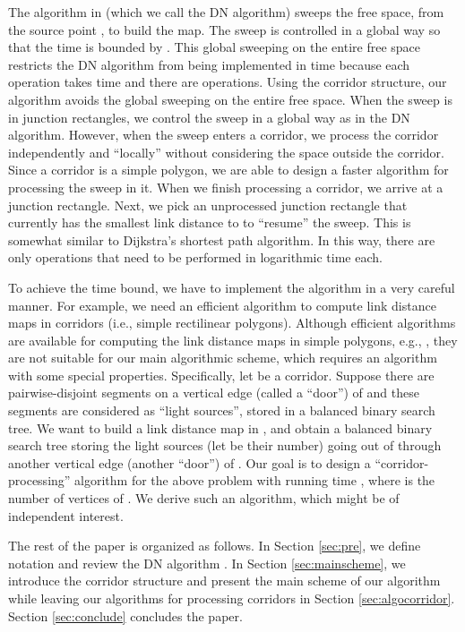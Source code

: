 \documentclass[english,runningheads,11pt]{llncs-revised}
\begin{document}
The algorithm in \cite{ref:DasGe91} (which we call the DN algorithm) sweeps the free space, from the source point , to build the map.
The sweep is controlled in a global way so that the time is bounded by
. This global sweeping on the entire free space restricts the DN algorithm from being implemented in  time because each operation takes  time and there are  operations. Using the corridor structure, our algorithm avoids the global sweeping on the entire free space.
When the sweep is in junction rectangles, we control the sweep in a global way as
in the DN algorithm. However, when the sweep enters a corridor,
we process the corridor independently and ``locally'' without considering the
space outside the corridor. Since a
corridor is a simple polygon, we are able to design a
faster algorithm for processing the sweep in it.
When we finish processing a corridor, we arrive at a junction rectangle.
Next, we pick an unprocessed junction
rectangle that currently has the smallest link distance to  to
``resume'' the sweep. This is somewhat similar to Dijkstra's shortest path algorithm.
In this way, there are only  operations that need to be performed in logarithmic time each.


To achieve the  time bound, we have to implement the algorithm in a very careful manner. For example, we need an efficient
algorithm to compute link distance maps in corridors (i.e.,
simple rectilinear polygons).
Although efficient algorithms are available for computing the link
distance maps in simple polygons, e.g.,
\cite{ref:deBergOn91,ref:HershbergerCo94,ref:LingasOp95,ref:SchuiererAn96},
they are not suitable for our main algorithmic scheme, which requires
an algorithm with some special properties. Specifically, let
 be a corridor. Suppose there are 
pairwise-disjoint segments on a vertical edge  (called a
``door'') of  and these segments are considered as ``light sources'', stored in a balanced binary search tree.  We
want to build a link distance map in , and obtain a balanced
binary search tree storing the light sources (let  be their number)
going out of  through another vertical edge 
(another ``door'') of . Our goal is to design
a ``corridor-processing'' algorithm for the above problem with running time
, where  is the number of vertices of . We derive such an
algorithm, which might be of independent interest.




The rest of the paper is organized as follows.
In Section \ref{sec:pre}, we define notation and
review the DN algorithm \cite{ref:DasGe91}.
In Section \ref{sec:mainscheme}, we introduce the corridor structure
and present the main scheme of our algorithm while leaving our
algorithms for processing corridors in Section \ref{sec:algocorridor}.
Section \ref{sec:conclude} concludes the paper.
\end{document}
